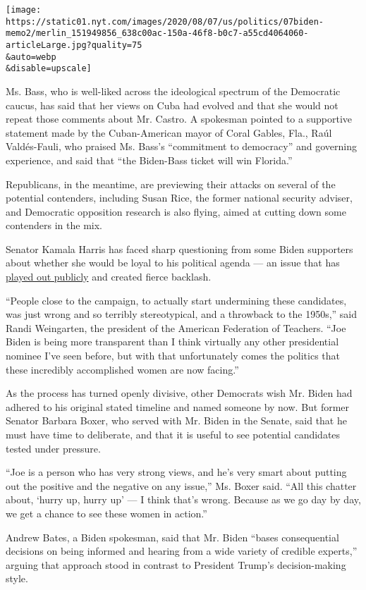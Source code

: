 \texttt{[image: https://static01.nyt.com/images/2020/08/07/us/politics/07biden-memo2/merlin\_151949856\_638c00ac-150a-46f8-b0c7-a55cd4064060-articleLarge.jpg?quality=75\\\&auto=webp\\\&disable=upscale]}

Ms. Bass, who is well-liked across the ideological spectrum of the
Democratic caucus, has said that her views on Cuba had evolved and that
she would not repeat those comments about Mr. Castro. A spokesman
pointed to a supportive statement made by the Cuban-American mayor of
Coral Gables, Fla., Raúl Valdés-Fauli, who praised Ms. Bass's
``commitment to democracy'' and governing experience, and said that
``the Biden-Bass ticket will win Florida.''

Republicans, in the meantime, are previewing their attacks on several of
the potential contenders, including Susan Rice, the former national
security adviser, and Democratic opposition research is also flying,
aimed at cutting down some contenders in the mix.

Senator Kamala Harris has faced sharp questioning from some Biden
supporters about whether she would be loyal to his political agenda ---
an issue that has
\href{https://www.nytimes.com/2020/07/31/us/politics/joseph-biden-vice-president.html}{played
out publicly} and created fierce backlash.

``People close to the campaign, to actually start undermining these
candidates, was just wrong and so terribly stereotypical, and a
throwback to the 1950s,'' said Randi Weingarten, the president of the
American Federation of Teachers. ``Joe Biden is being more transparent
than I think virtually any other presidential nominee I've seen before,
but with that unfortunately comes the politics that these incredibly
accomplished women are now facing.''

As the process has turned openly divisive, other Democrats wish Mr.
Biden had adhered to his original stated timeline and named someone by
now. But former Senator Barbara Boxer, who served with Mr. Biden in the
Senate, said that he must have time to deliberate, and that it is useful
to see potential candidates tested under pressure.

``Joe is a person who has very strong views, and he's very smart about
putting out the positive and the negative on any issue,'' Ms. Boxer
said. ``All this chatter about, `hurry up, hurry up' --- I think that's
wrong. Because as we go day by day, we get a chance to see these women
in action.''

Andrew Bates, a Biden spokesman, said that Mr. Biden ``bases
consequential decisions on being informed and hearing from a wide
variety of credible experts,'' arguing that approach stood in contrast
to President Trump's decision-making style.

